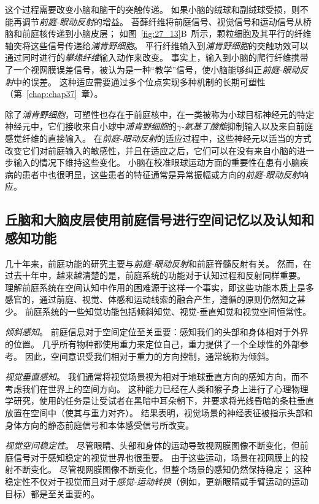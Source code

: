 这个过程需要改变小脑和脑干的突触传递。
如果小脑的绒球和副绒球受损，则不能再调节\textit{前庭-眼动反射}的增益。
苔藓纤维将前庭信号、视觉信号和运动信号从桥脑和前庭核传递到小脑皮层；
如图~\ref{fig:27_13}B~所示，颗粒细胞及其平行的纤维轴突将这些信号传递给\textit{浦肯野细胞}。
平行纤维输入到\textit{浦肯野细胞}的突触功效可以通过同时进行的\textit{攀缘纤维}输入动作来改变。
事实上，输入到小脑的爬行纤维携带了一个视网膜误差信号，被认为是一种“教学”信号，使小脑能够纠正\textit{前庭-眼动反射}中的误差。
这种适应需要通过多个位点实现多种机制的长期可塑性（第~\ref{chap:chap37}~章）。


除了\textit{浦肯野细胞}，可塑性也存在于前庭核中，在一类被称为小球目标神经元的特定神经元中，它们接收来自小球中\textit{浦肯野细胞}的\textit{$\gamma$-氨基丁酸能}抑制输入以及来自前庭感觉纤维的直接输入。
在\textit{前庭-眼动反射}的适应过程中，这些神经元以适当的方式改变它们对前庭输入的敏感性，并且在适应之后，它们可以在没有来自小脑的进一步输入的情况下维持这些变化。
小脑在校准眼球运动方面的重要性在患有小脑疾病的患者中也很明显，这些患者的特征通常是异常振幅或方向的\textit{前庭-眼动反射}响应。



\subsection{丘脑和大脑皮层使用前庭信号进行空间记忆以及认知和感知功能}

几十年来，前庭功能的研究主要与\textit{前庭-眼动反射}和前庭脊髓反射有关。
然而，在过去十年中，越来越清楚的是，前庭系统的功能对于认知过程和反射同样重要。
理解前庭系统在空间认知中作用的困难源于这样一个事实，即这些功能本质上是多感官的，通过前庭、视觉、体感和运动线索的融合产生，遵循的原则仍然知之甚少。
前庭系统的一些知觉功能包括倾斜知觉、视觉-垂直知觉和视觉空间恒常性。


\textit{倾斜感知}。
前庭信息对于空间定位至关重要：感知我们的头部和身体相对于外界的位置。
几乎所有物种都使用重力来定位自己，重力提供了一个全球性的外部参考。
因此，空间意识受我们相对于重力的方向控制，通常统称为倾斜。


\textit{视觉垂直感知}。
我们通常将视觉场景视为相对于地球垂直方向的感知方向，而不考虑我们在世界上的空间方向。
这种能力已经在人类和猴子身上进行了心理物理学研究，使用的任务是让受试者在黑暗中耳朵朝下，并要求将光线昏暗的条柱垂直放置在空间中（使其与重力对齐）。
结果表明，视觉场景的神经表征被指示头部和身体方向的静态前庭信号和本体感受信号所改变。


\textit{视觉空间稳定性}。
尽管眼睛、头部和身体的运动导致视网膜图像不断变化，但前庭信号对于感知稳定的视觉世界也很重要。
由于这些运动，场景在视网膜上的投射不断变化。
尽管视网膜图像不断变化，但整个场景的感知仍然保持稳定；
这种稳定性不仅对于视觉而且对于\textit{感觉-运动转换}（例如，更新眼睛或手臂运动的运动目标）都是至关重要的。



